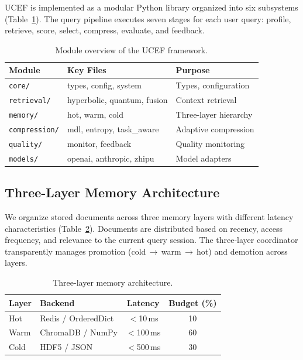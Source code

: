 \documentclass[journal]{IEEEtran}
\newcommand{\ucef}{\textsf{UCEF}}
\begin{document}
\ucef{} is implemented as a modular Python library organized into six
subsystems (Table~\ref{tab:modules}).  The query pipeline executes seven
stages for each user query: profile, retrieve, score, select, compress,
evaluate, and feedback.

\begin{table}[t]
\caption{Module overview of the \ucef{} framework.}
\label{tab:modules}
\centering
\small
\begin{tabular}{@{}lll@{}}
\toprule
Module & Key Files & Purpose \\
\midrule
\texttt{core/} & types, config, system & Types, configuration \\
\texttt{retrieval/} & hyperbolic, quantum, fusion & Context retrieval \\
\texttt{memory/} & hot, warm, cold & Three-layer hierarchy \\
\texttt{compression/} & mdl, entropy, task\_aware & Adaptive compression \\
\texttt{quality/} & monitor, feedback & Quality monitoring \\
\texttt{models/} & openai, anthropic, zhipu & Model adapters \\
\bottomrule
\end{tabular}
\end{table}

\subsection{Three-Layer Memory Architecture}

We organize stored documents across three memory layers with different
latency characteristics (Table~\ref{tab:memory}).  Documents are distributed
based on recency, access frequency, and relevance to the current query
session.  The three-layer coordinator transparently manages promotion
(cold\,$\to$\,warm\,$\to$\,hot) and demotion across layers.

\begin{table}[t]
\caption{Three-layer memory architecture.}
\label{tab:memory}
\centering
\small
\begin{tabular}{@{}llcc@{}}
\toprule
Layer & Backend & Latency & Budget (\%) \\
\midrule
Hot   & Redis / OrderedDict & $<$10\,ms  & 10 \\
Warm  & ChromaDB / NumPy    & $<$100\,ms & 60 \\
Cold  & HDF5 / JSON         & $<$500\,ms & 30 \\
\bottomrule
\end{tabular}
\end{table}
\end{document}
